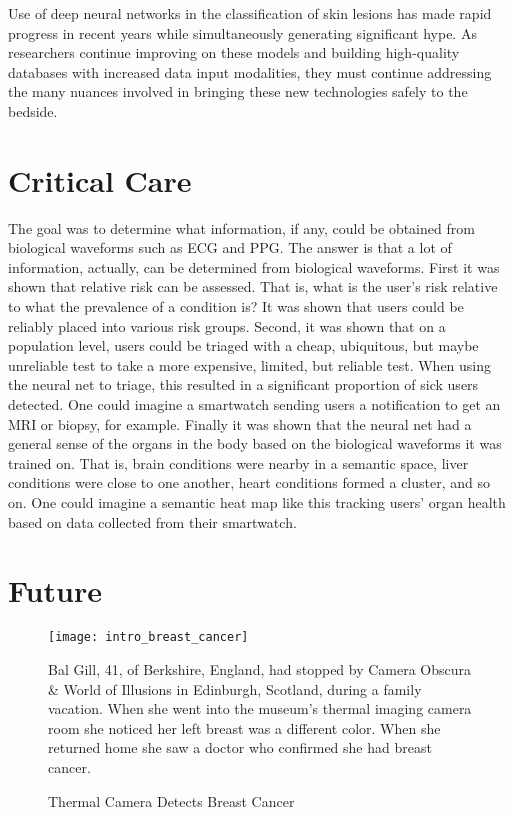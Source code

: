 Use of deep neural networks in the classification of skin lesions has made rapid progress in recent years while simultaneously generating significant hype. As researchers continue improving on these models and building high-quality databases with increased data input modalities, they must continue addressing the many nuances involved in bringing these new technologies safely to the bedside.

\section{Critical Care}

The goal was to determine what information, if any, could be obtained from biological waveforms such as ECG and PPG.  The answer is that a lot of information, actually, can be determined from biological waveforms.  First it was shown that relative risk can be assessed.  That is, what is the user's risk relative to what the prevalence of a condition is?  It was shown that users could be reliably placed into various risk groups.  Second, it was shown that on a population level, users could be triaged with a cheap, ubiquitous, but maybe unreliable test to take a more expensive, limited, but reliable test.  When using the neural net to triage, this resulted in a significant proportion of sick users detected.  One could imagine a smartwatch sending users a notification to get an MRI or biopsy, for example.  Finally it was shown that the neural net had a general sense of the organs in the body based on the biological waveforms it was trained on.  That is, brain conditions were nearby in a semantic space, liver conditions were close to one another, heart conditions formed a cluster, and so on.  One could imagine a semantic heat map like this tracking users' organ health based on data collected from their smartwatch.

\section{Future}

\begin{figure}
\begin{center}
    \texttt{[image: intro\_breast\_cancer]}
\end{center}
\caption{Thermal Camera Detects Breast Cancer}
\vspace{12px}
Bal Gill, 41, of Berkshire, England, had stopped by Camera Obscura \& World of Illusions in Edinburgh, Scotland, during a family vacation. When she went into the museum's thermal imaging camera room she noticed her left breast was a different color. When she returned home she saw a doctor who confirmed she had breast cancer.
\vspace{12px}
\label{fig:intro_breast_cancer}
\end{figure}

